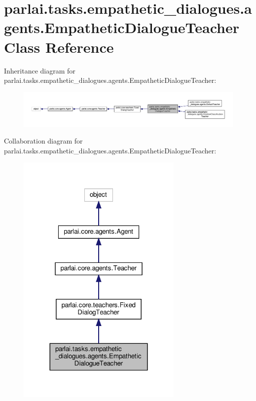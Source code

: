 \hypertarget{classparlai_1_1tasks_1_1empathetic__dialogues_1_1agents_1_1EmpatheticDialogueTeacher}{}\section{parlai.\+tasks.\+empathetic\+\_\+dialogues.\+agents.\+Empathetic\+Dialogue\+Teacher Class Reference}
\label{classparlai_1_1tasks_1_1empathetic__dialogues_1_1agents_1_1EmpatheticDialogueTeacher}


Inheritance diagram for parlai.\+tasks.\+empathetic\+\_\+dialogues.\+agents.\+Empathetic\+Dialogue\+Teacher\+:
\nopagebreak
\begin{figure}[H]
\begin{center}
\leavevmode
\includegraphics[width=350pt]{classparlai_1_1tasks_1_1empathetic__dialogues_1_1agents_1_1EmpatheticDialogueTeacher__inherit__graph}
\end{center}
\end{figure}


Collaboration diagram for parlai.\+tasks.\+empathetic\+\_\+dialogues.\+agents.\+Empathetic\+Dialogue\+Teacher\+:
\nopagebreak
\begin{figure}[H]
\begin{center}
\leavevmode
\includegraphics[width=228pt]{classparlai_1_1tasks_1_1empathetic__dialogues_1_1agents_1_1EmpatheticDialogueTeacher__coll__graph}
\end{center}
\end{figure}
